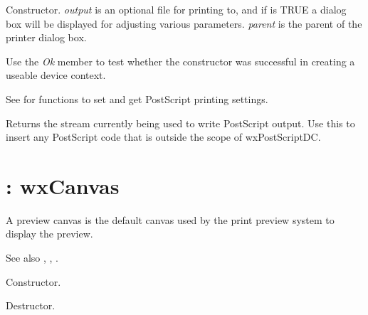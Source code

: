 

Constructor. {\it output} is an optional file for printing to, and if
 is TRUE a dialog box will be displayed for adjusting
various parameters. {\it parent} is the parent of the printer dialog box.

Use the {\it Ok} member to test whether the constructor was successful
in creating a useable device context.

See  for functions to set and
get PostScript printing settings.



Returns the stream currently being used to write PostScript output. Use this
to insert any PostScript code that is outside the scope of wxPostScriptDC.

\section{: wxCanvas}\label{wxpreviewcanvas}

A preview canvas is the default canvas used by the print preview
system to display the preview.

See also , ,
.



Constructor.



Destructor.


